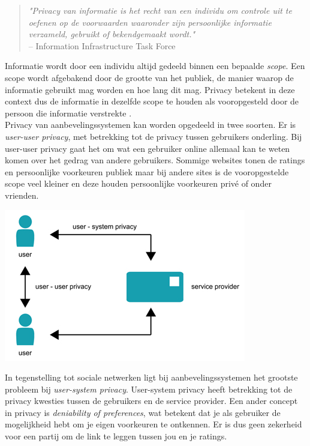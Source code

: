  \begin{quotation}
\emph{"Privacy van informatie is het recht van een individu om controle uit te oefenen op de voorwaarden waaronder zijn persoonlijke informatie verzameld, gebruikt of bekendgemaakt wordt."} \\-- Information Infrastructure Task Force \cite{pirs}
 \end{quotation}
Informatie wordt door een individu altijd gedeeld binnen een bepaalde \textit{scope}. Een scope wordt afgebakend door de grootte van het publiek, de manier waarop de informatie gebruikt mag worden en hoe lang dit mag.  Privacy betekent in deze context dus de informatie in dezelfde scope te houden als vooropgesteld door de persoon die informatie verstrekte \cite{pirs}.\\
Privacy van aanbevelingssystemen kan worden opgedeeld in twee soorten. Er is \textit{user-user privacy}, met betrekking tot de privacy tussen gebruikers onderling. Bij user-user privacy gaat het om wat een gebruiker online allemaal kan te weten komen over het gedrag van andere gebruikers. Sommige websites tonen de ratings en persoonlijke voorkeuren publiek maar bij andere sites is de vooropgestelde scope veel kleiner en deze houden persoonlijke voorkeuren priv\'e of onder vrienden.  



\begin{center}
\centering 
\includegraphics[scale=0.6,keepaspectratio]{fig/user-user-system-privacy}  

    \label{Figuur::usersystemprivacy} 
 
\end{center}
   
In tegenstelling tot sociale netwerken ligt bij aanbevelingssystemen het grootste probleem bij \textit{user-system privacy}. User-system privacy heeft betrekking tot de privacy kwesties tussen de gebruikers en de service provider. Een ander concept in privacy is \emph{deniability of preferences}, wat betekent dat je als gebruiker de mogelijkheid hebt om je eigen voorkeuren te ontkennen. Er is dus geen zekerheid voor een partij om de link te leggen tussen jou en je ratings.

